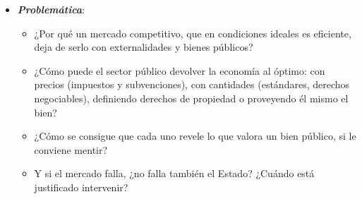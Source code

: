\documentclass[11pt]{article}
\begin{document}
\begin{itemize}
\begin{itemize}
\begin{itemize}
\begin{itemize}
    \item desde los años 60, la escuela de la elección pública\nocite{BuchananTullock1962Calculus} y George \textcite{Stigler1971Theory}\footnote{ recibió el Premio Nobel de Economía en 1982 «por sus estudios pioneros de las estructuras industriales, el funcionamiento de los mercados y las causas y los efectos de la regulación pública»\nocite{Nobel1982Stigler}.} estudian los , y \textcite{KydlandPrescott1977Rules}, su incapacidad para comprometerse;\footnote{ y  recibieron el Premio Nobel de Economía en 2004 «por sus contribuciones a la macroeconomía dinámica: la consistencia temporal de la política económica y las fuerzas que impulsan los ciclos económicos»\nocite{Nobel2004KydlandPrescott}.}
    \item {} muestra que muchas comunidades gestionan sus recursos comunes sin mercado ni Estado\nocite{Ostrom1990Governing}.\footnote{ recibió el Premio Nobel de Economía en 2009 «por su análisis de la gobernanza económica, en especial de los bienes comunes», compartido con \nocite{Nobel2009OstromWilliamson}.}
    \end{itemize}
  \end{itemize}
  \end{itemize}

\item \textbf{\emph{Problemática}}:
  \begin{itemize}
  \item ¿Por qué un mercado competitivo, que en condiciones ideales es eficiente, deja de serlo con externalidades y bienes públicos?
  \item ¿Cómo puede el sector público devolver la economía al óptimo: con precios (impuestos y subvenciones), con cantidades (estándares, derechos negociables), definiendo derechos de propiedad o proveyendo él mismo el bien?
  \item ¿Cómo se consigue que cada uno revele lo que valora un bien público, si le conviene mentir?
  \item Y si el mercado falla, ¿no falla también el Estado? ¿Cuándo está justificado intervenir?
  \end{itemize}


\end{itemize}
\end{document}
